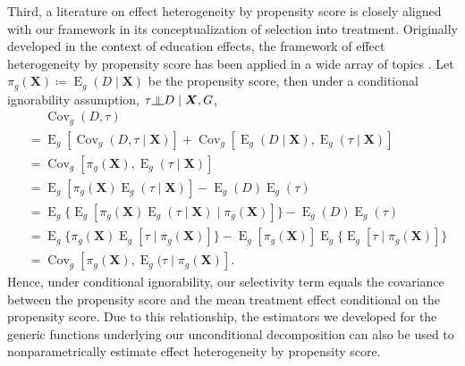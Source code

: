 \documentclass[12pt,a4paper]{article}
\newcommand{\indep}{\rotatebox[origin=c]{90}{$\models$}}  %
\newcommand{\Cov}{\operatorname{Cov}}
\newcommand{\E}{\operatorname{E}}
\def\X{{\boldsymbol X}}
\begin{document}
Third, a literature on effect heterogeneity by propensity score \citep{brand_who_2010, xie_estimating_2012, brand_uncovering_2021} is  closely aligned with our framework in its conceptualization of selection into treatment. Originally developed in the context of education effects, the framework of effect heterogeneity by propensity score has been applied in a wide array of topics \citep[e.g.,][]{brand_parental_2019, schafer_childhood_2013,choi_shadow_2016,musick_variation_2012, brand_impact_2011}. Let $\pi_g(\X) \coloneqq \E_g(D \mid \X)$ be the propensity score, then under a conditional ignorability assumption, $\tau \indep D \mid \X, G$,
\begin{align*}
&\phantom{{}={}} \Cov_g(D,\tau)  \\
&= \E_g[\Cov_g(D,\tau \mid \X)] + \Cov_g[\E_g(D \mid \X),\E_g(\tau \mid \X)] \\
&= \Cov_g[\pi_g(\X), \E_g(\tau \mid \X)] \\
&= \E_g [\pi_g(\X) \E_g(\tau \mid \X)] - \E_g(D)\E_g(\tau) \\
&= \E_g \lbrace \E_g [\pi_g(\X) \E_g(\tau \mid \X) \mid \pi_g(\X)] \rbrace - \E_g(D)\E_g(\tau) \\
&= \E_g \lbrace \pi_g(\X) \E_g[\tau \mid \pi_g(\X)] \rbrace - \E_g[\pi_g(\X)]\E_g\lbrace\E_g[\tau \mid \pi_g(\X)]\rbrace \\
&= \Cov_g [\pi_g(\X), \E_g(\tau \mid \pi_g(\X)].
\end{align*}
Hence, under conditional ignorability, our selectivity term equals the covariance between the propensity score and the mean treatment effect conditional on the propensity score. Due to this relationship, the estimators we developed for the generic functions underlying our unconditional decomposition can also be used to nonparametrically estimate effect heterogeneity by propensity score. 
\end{document}
